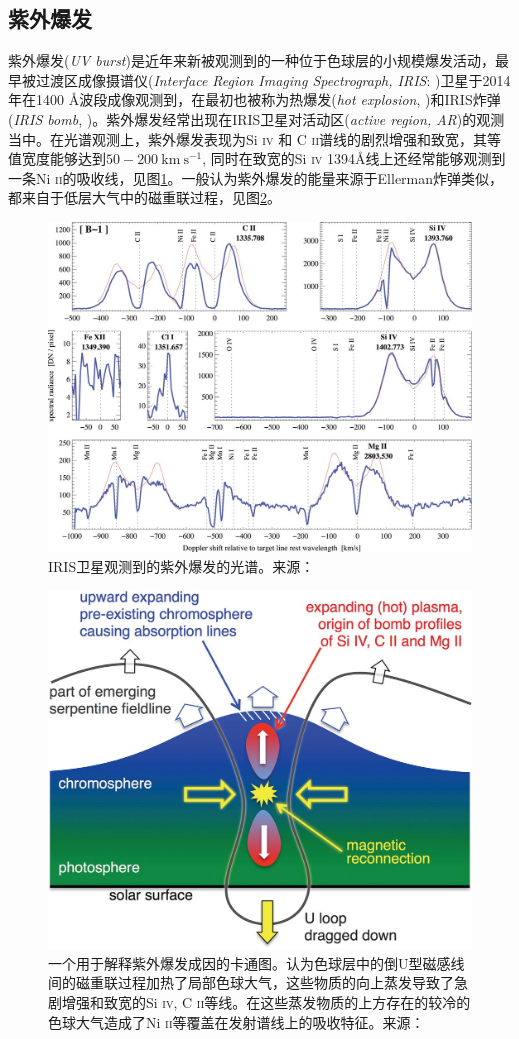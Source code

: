 \subsection{紫外爆发}
紫外爆发(\textit{UV burst})是近年来新被观测到的一种位于色球层的小规模爆发活动，最早被过渡区成像摄谱仪(\textit{Interface Region Imaging Spectrograph, IRIS}: \cites{DePontieu2014})卫星于2014年在1400 \mbox{\AA}波段成像观测到\parencite{Peter2014}，在最初也被称为热爆发(\textit{hot explosion}, \cite{Peter2014})和IRIS炸弹(\textit{IRIS bomb}, \cite{Tian2016})。紫外爆发经常出现在IRIS卫星对活动区(\textit{active region, AR})的观测当中\parencite{Tian2016,Polito2016,Hou2016}。在光谱观测上，紫外爆发表现为Si \textsc{iv} 和 C \textsc{ii}谱线的剧烈增强和致宽，其等值宽度能够达到$50-200\ \mathrm{km}\ \mathrm{s}^{-1}$, 同时在致宽的Si \textsc{iv} 1394\mbox{\AA}线上还经常能够观测到一条Ni \textsc{ii}的吸收线\parencite{Peter2014,Chen2019a}，见图\ref{fig:5}。一般认为紫外爆发的能量来源于Ellerman炸弹类似，都来自于低层大气中的磁重联过程\parencite{Peter2014,Tian2018b}，见图\ref{fig:6}。
\begin{figure}
	\centering
	\includegraphics[width=0.7\linewidth]{figs/fig5}
	\caption{IRIS卫星观测到的紫外爆发的光谱。来源：\textcites{Peter2014}}
	\label{fig:5}
\end{figure}
\begin{figure}
	\centering
	\includegraphics[width=0.7\linewidth]{figs/fig6}
	\caption{一个用于解释紫外爆发成因的卡通图。\textcite{Peter2014}认为色球层中的倒U型磁感线间的磁重联过程加热了局部色球大气，这些物质的向上蒸发导致了急剧增强和致宽的Si \textsc{iv}, C \textsc{ii}等线。在这些蒸发物质的上方存在的较冷的色球大气造成了Ni \textsc{ii}等覆盖在发射谱线上的吸收特征。来源：\textcites{Peter2014}}
	\label{fig:6}
\end{figure}

